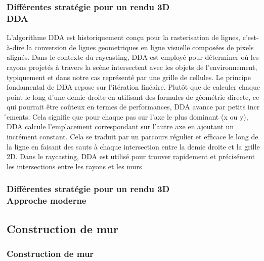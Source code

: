 \documentclass{beamer}
\begin{document}
\begin{frame}
    \frametitle{Différentes stratégie pour un rendu 3D \\
                \small DDA}           
    \begin{block}{}
        L'algorithme DDA est historiquement conçu pour la rasterisation de 
        lignes, c'est-à-dire la conversion de lignes geometriques en ligne 
        visuelle composées de pixels alignés. Dans le contexte du raycasting, 
        DDA est employé pour déterminer où les rayons projetés à travers la 
        scène intersectent avec les objets de l'environnement, typiquement et 
        dans notre cas représenté par une grille de cellules. Le principe 
        fondamental de DDA repose sur l'itération linéaire. Plutôt que de 
        calculer chaque point le long d'une demie droite en utilisant des formules 
        de géométrie directe, ce qui pourrait être coûteux en termes de performances, 
        DDA avance par petits incr ́ements. Cela signifie que pour chaque
        pas sur l'axe le plus dominant (x ou y), DDA calcule l'emplacement 
        correspondant sur l'autre axe en ajoutant un incrément constant. 
        Cela se traduit par un parcours régulier et efficace le long de la 
        ligne en faisant des sauts à chaque intersection entre la demie 
        droite et la grille 2D. Dans le raycasting, DDA est utilisé pour 
        trouver rapidement et précisément les intersections entre les rayons 
        et les murs
    \end{block}    
\end{frame}

\begin{frame}
    \frametitle{Différentes stratégie pour un rendu 3D \\
                \small Approche moderne}           
    \begin{block}{}
        
    \end{block}    
\end{frame}

\subsection{Construction de mur}

\begin{frame}
    \frametitle{Construction de mur}
    \begin{block}{}
    \end{block}
\end{frame}
\end{document}
